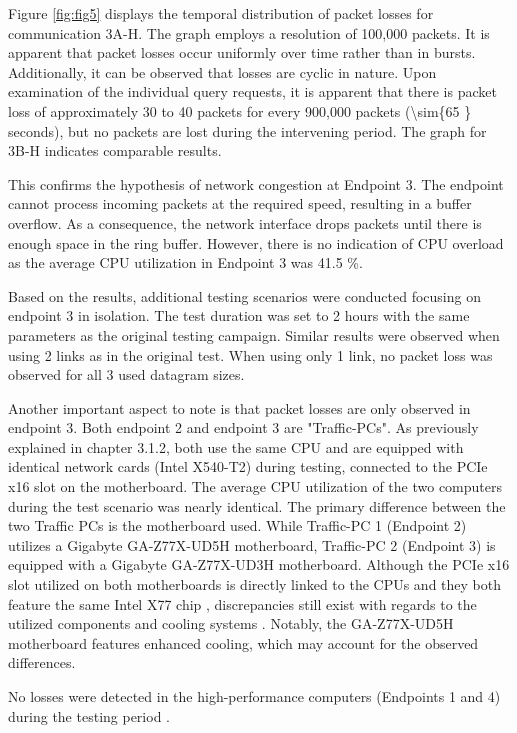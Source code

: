 \documentclass[	a4paper,
				11pt,
				DIV=11,
				bigheadings,
				idxtotoc,
				listof=totoc,	
				bibtotoc,		
				halfparskip,
				cleardoubleempty,
				oneside,
				openright]{scrartcl}
\begin{document}
Figure \ref{fig:fig5} displays the temporal distribution of packet losses for communication 3A-H. The graph employs a resolution of 100,000 packets.  It is apparent that packet losses occur uniformly over time rather than in bursts. Additionally, it can be observed that losses are cyclic in nature. Upon examination of the individual query requests, it is apparent that there is packet loss of approximately 30 to 40 packets for every 900,000 packets (\num{\sim{65 }}  seconds), but no packets are lost during the intervening period. The graph for 3B-H indicates comparable results.

This confirms the hypothesis of network congestion at Endpoint 3. The endpoint cannot process incoming packets at the required speed, resulting in a buffer overflow. As a consequence, the network interface drops packets until there is enough space in the ring buffer. However, there is no indication of CPU overload as the average CPU utilization in Endpoint 3 was 41.5 \%. 

Based on the results, additional testing scenarios were conducted focusing on endpoint 3 in isolation. The test duration was set to 2 hours with the same parameters as the original testing campaign. Similar results were observed when using 2 links as in the original test. When using only 1 link, no packet loss was observed for all 3 used datagram sizes.

Another important aspect to note is that packet losses are only observed in endpoint 3. Both endpoint 2 and endpoint 3 are "Traffic-PCs". As previously explained in chapter 3.1.2, both use the same CPU and are equipped with identical network cards (Intel X540-T2) during testing, connected to the PCIe x16 slot on the motherboard. The average CPU utilization of the two computers during the test scenario was nearly identical. The primary difference between the two Traffic PCs is the motherboard used. While Traffic-PC 1 (Endpoint 2) utilizes a Gigabyte GA-Z77X-UD5H motherboard, Traffic-PC 2 (Endpoint 3) is equipped with a Gigabyte GA-Z77X-UD3H motherboard. Although the PCIe x16 slot utilized on both motherboards is directly linked to the CPUs and they both feature the same Intel X77 chip \cite{tbd}\cite{tbd}, discrepancies still exist with regards to the utilized components and cooling systems \cite{tbd}. Notably, the GA-Z77X-UD5H motherboard features enhanced cooling, which may account for the observed differences.

No losses were detected in the high-performance computers (Endpoints 1 and 4) during the testing period .
\end{document}
